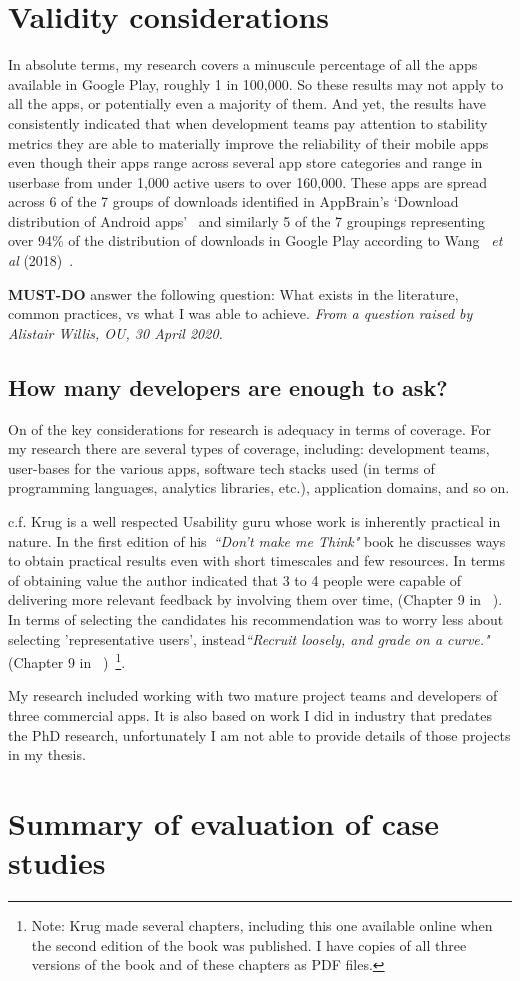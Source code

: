 \section{Validity considerations}
In absolute terms, my research covers a minuscule percentage of all the apps available in Google Play, roughly 1 in 100,000. So these results may not apply to all the apps, or potentially even a majority of them. And yet, the results have consistently indicated that when development teams pay attention to stability metrics they are able to materially improve the reliability of their mobile apps even though their apps range across several app store categories and range in userbase from under 1,000 active users to over 160,000. These apps are spread across 6 of the 7 groups of downloads identified in AppBrain's `Download distribution of Android apps'~\cite{appbrain_download_statistics_june_2019} and similarly 5 of the 7 groupings representing over 94\% of the distribution of downloads in Google Play according to Wang ~\emph{et al} (2018)~\cite{wang2018beyond}.

\textbf{MUST-DO} answer the following question: What exists in the literature, common practices, vs what I was able to achieve. \emph{From a question raised by Alistair Willis, OU, 30 April 2020.}

\subsection{How many developers are enough to ask?}
On of the key considerations for research is adequacy in terms of coverage. For my research there are several types of coverage, including: development teams, user-bases for the various apps, software tech stacks used (in terms of programming languages, analytics libraries, etc.), application domains, and so on. 

c.f. Krug is a well respected Usability guru whose work is inherently practical in nature. In the first edition of his~\emph{``Don't make me Think"} book he discusses ways to obtain practical results even with short timescales and few resources. In terms of obtaining value the author indicated that 3 to 4 people were capable of delivering more relevant feedback by involving them over time, (Chapter 9 in ~\cite{krug2000dont_make_me_think}). In terms of selecting the candidates his recommendation was to worry less about selecting 'representative users', instead\emph{``Recruit loosely, and grade on a curve."} (Chapter 9 in ~\cite{krug2000dont_make_me_think})~\footnote{Note: Krug made several chapters, including this one available online when the second edition of the book was published. I have copies of all three versions of the book and of these chapters as PDF files.}.

My research included working with two mature project teams and developers of three commercial apps. It is also based on work I did in industry that predates the PhD research, unfortunately I am not able to provide details of those projects in my thesis. 

\section{Summary of evaluation of case studies}

